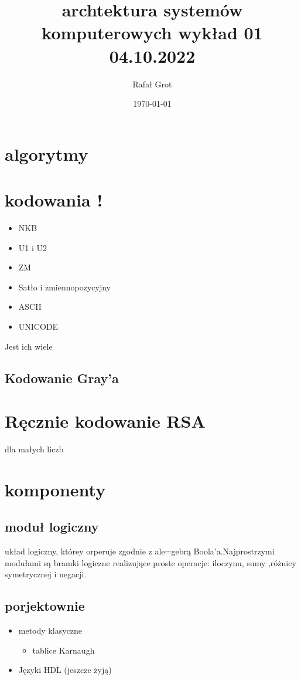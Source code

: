 \documentclass[11pt]{article}
\author{Rafał Grot}
\date{\today}
\title{archtektura systemów komputerowych wykład 01 04.10.2022}
\begin{document}
\maketitle
\tableofcontents

\section{algorytmy}
\label{sec:org6ecc595}
\section{kodowania !}
\label{sec:org1b132d4}
\begin{itemize}
\item NKB
\item U1 i U2
\item ZM
\item Satło i zmiennopozycyjny
\item ASCII
\item UNICODE
\end{itemize}
Jest ich wiele
\subsection{Kodowanie Gray'a}
\label{sec:org1284817}
\section{Ręcznie kodowanie RSA}
\label{sec:orgf9aa1e8}
dla małych liczb
\section{komponenty}
\label{sec:org0b56daf}
\subsection{moduł logiczny}
\label{sec:orgf38ab56}
układ logiczny, którey orperuje zgodnie z ale=gebrą Boola'a.Najprostrzymi modułami są bramki logiczne realizujące proste operacje: iloczynu, sumy ,różnicy symetrycznej i negacji.
\subsection{porjektownie}
\label{sec:org8400446}
\begin{itemize}
\item metody klasyczne
\begin{itemize}
\item tablice Karnaugh
\end{itemize}
\item Języki HDL
(jeszcze żyją)
\end{itemize}
\end{document}
